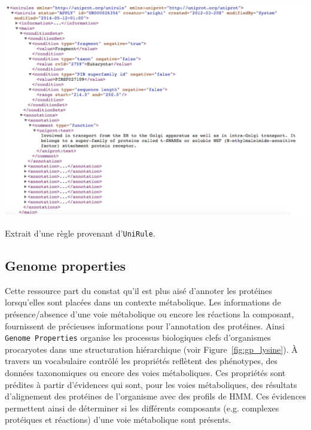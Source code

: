 \begin{refsegment}
    \begin{shadedfigure}[H]
        \centering
        \includegraphics[width=\textwidth]{img/regle_unirule.png}
        \caption{Extrait d'une règle provenant d'\texttt{UniRule}. }
        \label{fig:regle_unirule}
    \end{shadedfigure}
    
    
    
    \subsection{Genome properties}
    
    Cette ressource part du constat qu'il est plus aisé d'annoter les protéines lorsqu'elles sont placées dans un contexte métabolique. Les informations de présence/absence d'une voie métabolique ou encore les réactions la composant, fournissent de précieuses informations pour l'annotation des protéines. Ainsi \texttt{Genome Properties} \cite{selengut2007tigrfams,haft2005genome,haft2013tigrfams} organise les processus biologiques clefs d'organismes procaryotes dans une structuration hiérarchique (voir Figure~\cref{fig:gp_lysine}). À travers un vocabulaire contrôlé les propriétés reflètent des phénotypes, des données taxonomiques ou encore des voies métaboliques.  Ces propriétés sont prédites à partir d’évidences qui sont, pour les voies métaboliques, des résultats d’alignement des protéines de l’organisme avec des profils de \gls{HMM}. Ces évidences permettent ainsi de déterminer si les différents composants (e.g. complexes protéiques et réactions) d’une voie métabolique sont présents. 
    

\end{refsegment}
